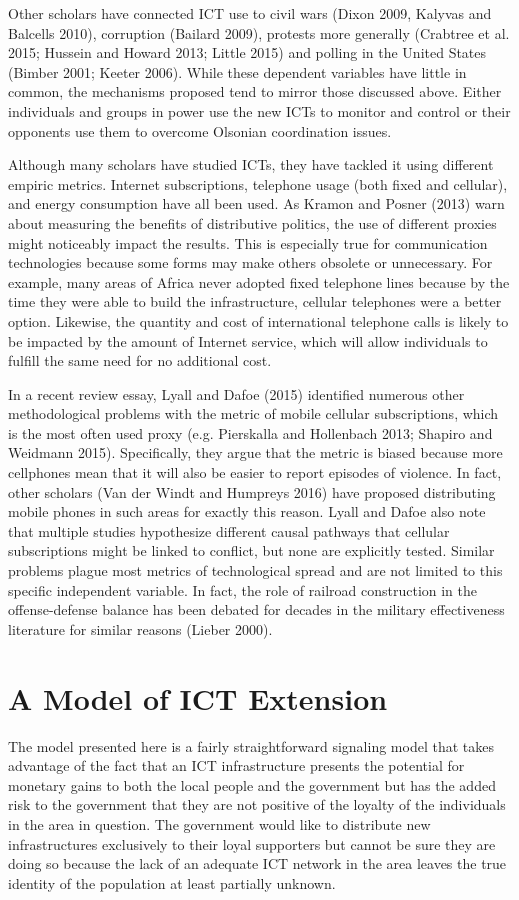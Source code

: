 \documentclass[12pt]{article}
\begin{document}
	Other scholars have connected ICT use to civil wars (Dixon 2009, Kalyvas and Balcells 2010), corruption (Bailard 2009), protests more generally (Crabtree et al. 2015; Hussein and Howard 2013; Little 2015) and polling in the United States (Bimber 2001; Keeter 2006). While these dependent variables have little in common, the mechanisms proposed tend to mirror those discussed above. Either individuals and groups in power use the new ICTs to monitor and control or their opponents use them to overcome Olsonian coordination issues. 
	
	Although many scholars have studied ICTs, they have tackled it using different empiric metrics. Internet subscriptions, telephone usage (both fixed and cellular), and energy consumption have all been used. As Kramon and Posner (2013) warn about measuring the benefits of distributive politics, the use of different proxies might noticeably impact the results. This is especially true for communication technologies because some forms may make others obsolete or unnecessary. For example, many areas of Africa never adopted fixed telephone lines because by the time they were able to build the infrastructure, cellular telephones were a better option. Likewise, the quantity and cost of international telephone calls is likely to be impacted by the amount of Internet service, which will allow individuals to fulfill the same need for no additional cost.
	
	In a recent review essay, Lyall and Dafoe (2015) identified numerous other methodological problems with the metric of mobile cellular subscriptions, which is the most often used proxy (e.g. Pierskalla and Hollenbach 2013; Shapiro and Weidmann 2015). Specifically, they argue that the metric is biased because more cellphones mean that it will also be easier to report episodes of violence. In fact, other scholars (Van der Windt and Humpreys 2016) have proposed distributing mobile phones in such areas for exactly this reason. Lyall and Dafoe also note that multiple studies hypothesize different causal pathways that cellular subscriptions might be linked to conflict, but none are explicitly tested. Similar problems plague most metrics of technological spread and are not limited to this specific independent variable. In fact, the role of railroad construction in the offense-defense balance has been debated for decades in the military effectiveness literature for similar reasons (Lieber 2000). 
	
	\section{A Model of ICT Extension}
	The model presented here is a fairly straightforward signaling model that takes advantage of the fact that an ICT infrastructure presents the potential for monetary gains to both the local people and the government but has the added risk to the government that they are not positive of the loyalty of the individuals in the area in question. The government would like to distribute new infrastructures exclusively to their loyal supporters but cannot be sure they are doing so because the lack of an adequate ICT network in the area leaves the true identity of the population at least partially unknown.
	
\end{document}
